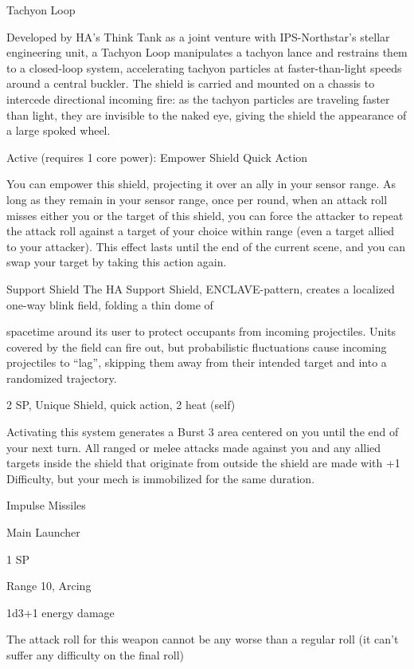                                                   Tachyon Loop

 Developed by HA’s Think Tank as a joint venture with IPS-Northstar’s stellar engineering unit, a Tachyon
 Loop manipulates a tachyon lance and restrains them to a closed-loop system, accelerating tachyon
 particles at faster-than-light speeds around a central buckler. The shield is carried and mounted on a
 chassis to intercede directional incoming fire: as the tachyon particles are traveling faster than light, they
 are invisible to the naked eye, giving the shield the appearance of a large spoked wheel.

 Active (requires 1 core power): Empower Shield
 Quick Action

 You can empower this shield, projecting it over an ally in your sensor range. As long as they remain in
 your sensor range, once per round, when an attack roll misses either you or the target of this shield,
 you can force the attacker to repeat the attack roll against a target of your choice within range (even a
 target allied to your attacker). This effect lasts until the end of the current scene, and you can swap
 your target by taking this action again.

Support Shield
The HA Support Shield, ENCLAVE-pattern, creates a localized one-way blink field, folding a thin dome of

spacetime around its user to protect occupants from incoming projectiles. Units covered by the field can
fire out, but probabilistic fluctuations cause incoming projectiles to ``lag'', skipping them away from their
intended target and into a randomized trajectory.

2 SP, Unique
Shield, quick action, 2 heat (self)


Activating this system generates a Burst 3 area centered on you until the end of your next turn.
All ranged or melee attacks made against you and any allied targets inside the shield that
originate from outside the shield are made with +1 Difficulty, but your mech is immobilized for the
same duration.


Impulse Missiles

Main Launcher

1 SP

Range 10, Arcing

1d3+1 energy damage

The attack roll for this weapon cannot be any worse than a regular roll (it can’t suffer any
difficulty on the final roll)


